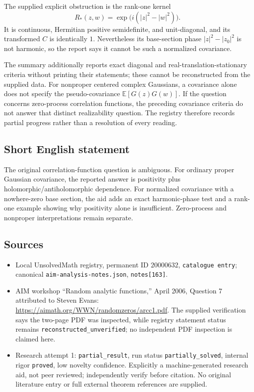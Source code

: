 \documentclass[11pt]{article}
\newcommand{\E}{\mathbb{E}}
\begin{document}
The supplied explicit obstruction is the rank-one kernel
\[
 R_*(z,w)=\exp\big(i(|z|^2-|w|^2)\big).
\]
It is continuous, Hermitian positive semidefinite, and unit-diagonal, and its transformed $C$ is identically $1$. Nevertheless its base-section phase $|z|^2-|z_0|^2$ is not harmonic, so the report says it cannot be such a normalized covariance.

The summary additionally reports exact diagonal and real-translation-stationary criteria without printing their statements; these cannot be reconstructed from the supplied data. For nonproper centered complex Gaussians, a covariance alone does not specify the pseudo-covariance $\E[G(z)G(w)]$. If the question concerns zero-process correlation functions, the preceding covariance criteria do not answer that distinct realizability question. The registry therefore records partial progress rather than a resolution of every reading.
\subsection{Short English statement}
The original correlation-function question is ambiguous. For ordinary proper Gaussian covariance, the reported answer is positivity plus holomorphic/antiholomorphic dependence. For normalized covariance with a nowhere-zero base section, the aid adds an exact harmonic-phase test and a rank-one example showing why positivity alone is insufficient. Zero-process and nonproper interpretations remain separate.
\subsection{Sources}
\begin{itemize}
\item Local UnsolvedMath registry, permanent ID $20000632$, \texttt{catalogue entry}; canonical \texttt{aim-analysis-notes.json}, \texttt{notes[163]}.
\item AIM workshop ``Random analytic functions,'' April 2006, Question 7 attributed to Steven Evans: \url{https://aimath.org/WWN/randomzeros/arcc1.pdf}. The supplied verification says the two-page PDF was inspected, while registry statement status remains \texttt{reconstructed\_unverified}; no independent PDF inspection is claimed here.
\item Research attempt 1: \texttt{partial\_result}, run status \texttt{partially\_solved}, internal rigor \texttt{proved}, low novelty confidence. Explicitly a machine-generated research aid, not peer reviewed; independently verify before citation. No original literature entry or full external theorem references are supplied.
\end{itemize}
\end{document}
